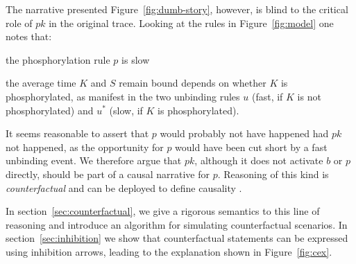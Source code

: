 The narrative presented Figure~\ref{fig:dumb-story}, however, is blind
to the critical role of $pk$ in the original trace. Looking at the
rules in Figure~\ref{fig:model} one notes that:
\begin{inparaenum}[(i)]
\item the phosphorylation rule $p$ is slow
\item the average time $K$ and $S$ remain bound depends on whether $K$
  is phosphorylated, as manifest in the two unbinding rules $u$ (fast,
  if $K$ is not phosphorylated) and $u^{*}$ (slow, if $K$ is
  phosphorylated).
\end{inparaenum} It seems reasonable to assert that $p$ would probably
not have happened had $pk$ not happened, as the opportunity for $p$
would have been cut short by a fast unbinding event. We therefore
argue that $pk$, although it does not activate $b$ or $p$ directly,
should be part of a causal narrative for $p$. Reasoning of this kind
is \textit{counterfactual} and can be deployed to define causality
\cite{lewis1974causation,pearl2009causality}.

In section~\ref{sec:counterfactual}, we give a rigorous semantics to
this line of reasoning and introduce an algorithm for simulating
counterfactual scenarios. In section~\ref{sec:inhibition} we show that
counterfactual statements can be expressed using inhibition arrows,
leading to the explanation shown in Figure~\ref{fig:cex}.